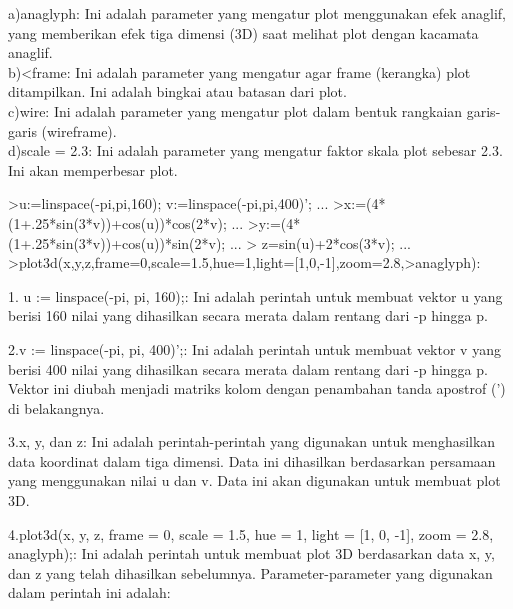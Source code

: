 \documentclass[a4paper,10pt]{article}
\begin{document}
\begin{eulernotebook}
\begin{eulercomment}
\begin{eulercomment}
\begin{eulercomment}
\begin{eulercomment}
\begin{eulercomment}
\begin{eulercomment}
\begin{eulercomment}
\begin{eulercomment}
\begin{eulercomment}
a)anaglyph: Ini adalah parameter yang mengatur plot menggunakan efek
anaglif, yang memberikan efek tiga dimensi (3D) saat melihat plot
dengan kacamata anaglif.\\
b)\textless{}frame: Ini adalah parameter yang mengatur agar frame (kerangka)
plot ditampilkan. Ini adalah bingkai atau batasan dari plot.\\
c)wire: Ini adalah parameter yang mengatur plot dalam bentuk rangkaian
garis-garis (wireframe).\\
d)scale = 2.3: Ini adalah parameter yang mengatur faktor skala plot
sebesar 2.3. Ini akan memperbesar plot.
\end{eulercomment}
\begin{eulerprompt}
>u:=linspace(-pi,pi,160); v:=linspace(-pi,pi,400)';  ...
>x:=(4*(1+.25*sin(3*v))+cos(u))*cos(2*v); ...
>y:=(4*(1+.25*sin(3*v))+cos(u))*sin(2*v); ...
> z=sin(u)+2*cos(3*v); ...
>plot3d(x,y,z,frame=0,scale=1.5,hue=1,light=[1,0,-1],zoom=2.8,>anaglyph):
\end{eulerprompt}
\begin{eulercomment}
1. u := linspace(-pi, pi, 160);: Ini adalah perintah untuk membuat
vektor u yang berisi 160 nilai yang dihasilkan secara merata dalam
rentang dari -p hingga p.

2.v := linspace(-pi, pi, 400)';: Ini adalah perintah untuk membuat
vektor v yang berisi 400 nilai yang dihasilkan secara merata dalam
rentang dari -p hingga p. Vektor ini diubah menjadi matriks kolom
dengan penambahan tanda apostrof (') di belakangnya.

3.x, y, dan z: Ini adalah perintah-perintah yang digunakan untuk
menghasilkan data koordinat dalam tiga dimensi. Data ini dihasilkan
berdasarkan persamaan yang menggunakan nilai u dan v. Data ini akan
digunakan untuk membuat plot 3D.

4.plot3d(x, y, z, frame = 0, scale = 1.5, hue = 1, light = [1, 0, -1],
zoom = 2.8, anaglyph);: Ini adalah perintah untuk membuat plot 3D
berdasarkan data x, y, dan z yang telah dihasilkan sebelumnya.
Parameter-parameter yang digunakan dalam perintah ini adalah:


\end{eulercomment}
\end{eulercomment}
\end{eulercomment}
\end{eulercomment}
\end{eulercomment}
\end{eulercomment}
\end{eulercomment}
\end{eulercomment}
\end{eulercomment}
\end{eulernotebook}
\end{document}
